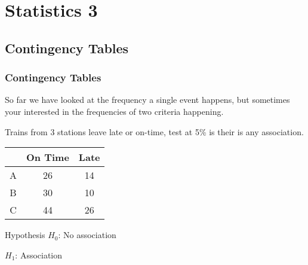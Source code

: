 \chapter*{Statistics 3}

\section{Contingency Tables}

    \newpage
    \subsection{Contingency Tables}
        So far we have looked at the frequency a single event happens, but sometimes your interested in the frequencies of two criteria happening.
        
        \begin{example}
        {
            Trains from 3 stations leave late or on-time, test at 5\% is their is any association.\\
        
            \begin{center}
            \begin{tabular}{c|c|c}
                  & On Time & Late \\
                \hline
                A & 26      & 14   \\
                B & 30      & 10   \\
                C & 44      & 26   \\
            \end{tabular}
            \end{center}
        }
        
        
        \begin{step}{Hypothesis}
        $H_0$: No association
        
        $H_1$: Association
        \end{step}
        

\end{example}
